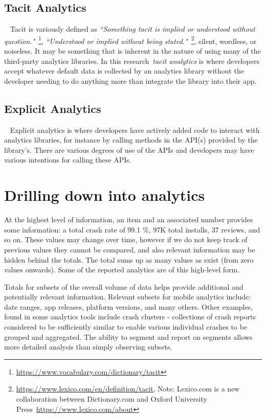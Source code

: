 \subsection{Tacit Analytics}~\label{subsection-tacit-analytics}
Tacit is variously defined as \emph{``Something tacit is implied or understood without question."}~\footnote{\url{https://www.vocabulary.com/dictionary/tacit}}, \emph{``Understood or implied without being stated."}~\footnote{\url{https://www.lexico.com/en/definition/tacit}, Note: Lexico.com is a new collaboration between Dictionary.com and Oxford University Press~\url{https://www.lexico.com/about}}, silent, wordless, or noiseless. 
%
It may be something that is inherent in the nature of using many of the third-party analytics libraries. In this research~\emph{tacit analytics} is where developers accept whatever default data is collected by an analytics library without the developer needing to do anything more than integrate the library into their app. 

\subsection{Explicit Analytics}~\label{subsection-explicit-analytics}
Explicit analytics is where developers have actively added code to interact with analytics libraries, for instance by calling methods in the API(s) provided by the library's. There are various degrees of use of the APIs and developers may have various intentions for calling these APIs.

\section{Drilling down into analytics}\label{section-drilling-down-into-analytics}
At the highest level of information, an item and an associated number provides some information: a total crash rate of 99.1 \%, 97K total installs, 37 reviews, and so on. These values may change over time, however if we do not keep track of previous values they cannot be compared, and also relevant information may be hidden behind the totals. The total sums up as many values as exist (from zero values onwards). Some of the reported analytics are of this high-level form.

Totals for subsets of the overall volume of data helps provide additional and potentially relevant information. Relevant subsets for mobile analytics include: date ranges, app releases, platform versions, and many others. Other examples, found in some analytics tools include crash clusters - collections of crash reports considered to be sufficiently similar to enable various individual crashes to be grouped and aggregated. The ability to segment and report on segments allows more detailed analysis than simply observing subsets. 

